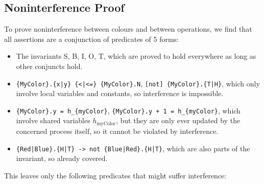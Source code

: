 \documentclass[a4paper, 11pt]{article}
\begin{document}
\subsection*{Noninterference Proof}



To prove noninterference between colours and between operations, we find that all assertions are a conjunction of predicates of 5 forms:
\begin{itemize}
    \item The invariants S, B, I, O, T, which are proved to hold everywhere as long as other conjuncts hold.
    \item \texttt{\{MyColor\}.\{x|y\} \{<|<=\} \{MyColor\}.N}, \texttt{[not] \{MyColor\}.\{T|H\}}, which only involve local variables and constants, so interference is impossible.
    \item \texttt{\{MyColor\}.y = h\_\{myColor\}}, \texttt{\{MyColor\}.y + 1 = h\_\{myColor\}}, which involve shared variables $h_\text{myColor}$, but they are only ever updated by the concerned process itself, so it cannot be violated by interference.
    \item \texttt{\{Red|Blue\}.\{H|T\} -> not \{Blue|Red\}.\{H|T\}}, which are also parts of the invariant, so already covered.
\end{itemize}

This leaves only the following predicates that might suffer interference:
\end{document}
